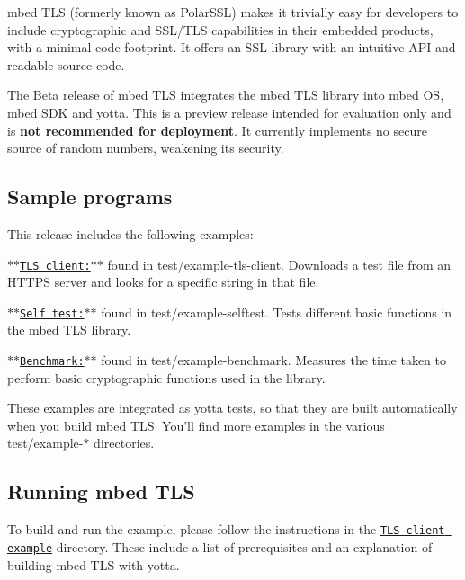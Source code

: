 mbed T\-L\-S (formerly known as Polar\-S\-S\-L) makes it trivially easy for developers to include cryptographic and S\-S\-L/\-T\-L\-S capabilities in their embedded products, with a minimal code footprint. It offers an S\-S\-L library with an intuitive A\-P\-I and readable source code.

The Beta release of mbed T\-L\-S integrates the mbed T\-L\-S library into mbed O\-S, mbed S\-D\-K and yotta. This is a preview release intended for evaluation only and is {\bfseries not recommended for deployment}. It currently implements no secure source of random numbers, weakening its security.

\subsection*{Sample programs}

This release includes the following examples\-:
\begin{DoxyEnumerate}
\item \href{https://github.com/ARMmbed/mbedtls/blob/development/yotta/data/example-tls-client}{\tt $\ast$$\ast$\-T\-L\-S client\-:$\ast$$\ast$} found in {\ttfamily test/example-\/tls-\/client}. Downloads a test file from an H\-T\-T\-P\-S server and looks for a specific string in that file.
\item \href{https://github.com/ARMmbed/mbedtls/blob/development/yotta/data/example-selftest}{\tt $\ast$$\ast$\-Self test\-:$\ast$$\ast$} found in {\ttfamily test/example-\/selftest}. Tests different basic functions in the mbed T\-L\-S library.
\item \href{https://github.com/ARMmbed/mbedtls/blob/development/yotta/data/example-benchmark}{\tt $\ast$$\ast$\-Benchmark\-:$\ast$$\ast$} found in {\ttfamily test/example-\/benchmark}. Measures the time taken to perform basic cryptographic functions used in the library.
\end{DoxyEnumerate}

These examples are integrated as yotta tests, so that they are built automatically when you build mbed T\-L\-S. You'll find more examples in the various {\ttfamily test/example-\/$\ast$} directories.

\subsection*{Running mbed T\-L\-S}

To build and run the example, please follow the instructions in the \href{https://github.com/ARMmbed/mbedtls/blob/development/yotta/data/example-tls-client}{\tt T\-L\-S client example} directory. These include a list of prerequisites and an explanation of building mbed T\-L\-S with yotta.

